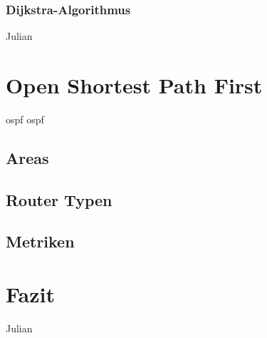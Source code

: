 \documentclass[1pt,a4paper,final]{article}
\begin{document}
\subsubsection{Dijkstra-Algorithmus}
Julian
\section{Open Shortest Path First}
\ac{ospf} \ac{ospf}
\subsection{Areas}
\subsection{Router Typen}
\subsection{Metriken}
\section{Fazit}
Julian

\clearpage
\nocite{*}
\printbibliography
\end{document}
